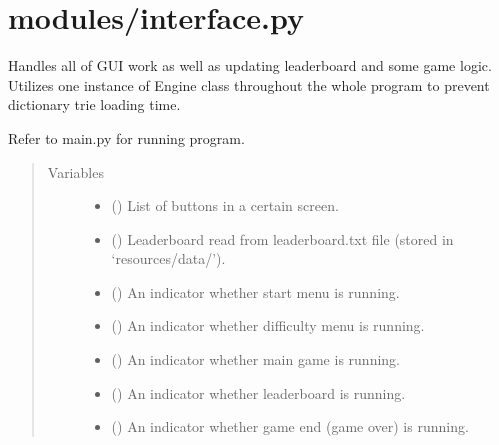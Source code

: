 \documentclass[letterpaper,10pt,english]{sphinxmanual}
\begin{document}
\section{modules/interface.py}
\label{\detokenize{index:modules-interface-py}}

\begin{fulllineitems}
Handles all of GUI work as well as updating leaderboard and some game logic.
Utilizes one instance of Engine class throughout the whole program to prevent
dictionary trie loading time.

Refer to main.py for running program.
\begin{quote}\begin{description}
\item[{Variables}] \leavevmode\begin{itemize}
\item {} 
 () \textendash{} List of buttons in a certain screen.

\item {} 
 () \textendash{} Leaderboard read from leaderboard.txt file (stored in ‘resources/data/’).

\item {} 
 () \textendash{} An indicator whether start menu is running.

\item {} 
 () \textendash{} An indicator whether difficulty menu is running.

\item {} 
 () \textendash{} An indicator whether main game is running.

\item {} 
 () \textendash{} An indicator whether leaderboard is running.

\item {} 
 () \textendash{} An indicator whether game end (game over) is running.


\end{itemize}
\end{description}
\end{quote}
\end{fulllineitems}
\end{document}
